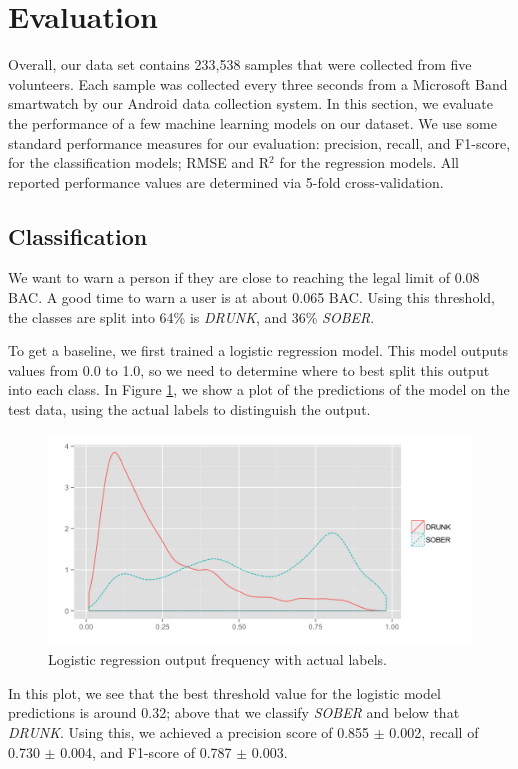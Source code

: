 \section{Evaluation}

Overall, our data set contains 233,538 samples that were collected from five volunteers. Each sample was collected every three seconds from a Microsoft Band smartwatch by our Android data collection system. In this section, we evaluate the performance of a few machine learning models on our dataset. We use some standard performance measures for our evaluation: precision, recall, and F1-score, for the classification models; RMSE and R$^2$ for the regression models. All reported performance values are determined via 5-fold cross-validation.

\subsection{Classification}

We want to warn a person if they are close to reaching the legal limit of 0.08 BAC. A good time to warn a user is at about 0.065 BAC. Using this threshold, the classes are split into 64\% is \textit{DRUNK}, and 36\% \textit{SOBER}.

To get a baseline, we first trained a logistic regression model. This model outputs values from 0.0 to 1.0, so we need to determine where to best split this output into each class. In Figure \ref{fig:log_pred_density}, we show a plot of the predictions of the model on the test data, using the actual labels to distinguish the output. \begin{figure}
	\includegraphics[width=1.0\textwidth]{../figs/log_pred_density}
	\caption{Logistic regression output frequency with actual labels.}
	\label{fig:log_pred_density}
\end{figure}In this plot, we see that the best threshold value for the logistic model predictions is around 0.32; above that we classify \textit{SOBER} and below that \textit{DRUNK}. Using this, we achieved a precision score of 0.855 $\pm$ 0.002, recall of 0.730 $\pm$ 0.004, and F1-score of 0.787 $\pm$ 0.003.

